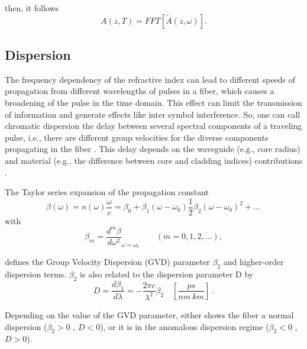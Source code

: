         then, it follows
        \begin{equation} \label{eq_deffft}
                A(z,T) = FFT \left[ \tilde{A}(z,\omega) \right].
            \end{equation}
            
            
    \subsection{Dispersion}
        The frequency dependency of the refractive index can lead to different speeds of propagation from different wavelengths of pulses in a fiber, which causes a broadening of the pulse in the time domain. This effect can limit the transmission of information and generate effects like inter symbol interference.  So, one can call chromatic dispersion the delay between several spectral components of a traveling pulse, i.e., there are different group velocities for the diverse components propagating in the fiber  \citep{Udayakumar2013ChromaticDC}. This delay depends on the waveguide (e.g., core radius) and material (e.g., the difference between core and cladding indices) contributions \citep{dudley_taylor_2010}. 
        
        The Taylor series expansion of the propagation constant 
        \begin{equation}
             \beta(\omega) = n (\omega)\frac{\omega}{c} = \beta_0 + \beta_1(\omega-\omega_0) \frac{1}{2}\beta_2(\omega-\omega_0)^2+...\, 
             \label{eq_betas}
        \end{equation}
        with 
        \begin{equation}
            \beta_m = \frac{d^m\beta}{d\omega^2}_{\omega = \omega_0} \qquad (m = 0,1,2,...),
            \label{eq_dbeta}
        \end{equation}
        
        
        defines the Group Velocity Dispersion (GVD) parameter $\beta_2$  and higher-order dispersion terms.  $\beta_2$ is also related to the dispersion parameter D by
        \begin{equation}
            D = \frac{d\beta_1}{d\lambda} = - \frac{2\pi c}{\lambda^2}\beta_2 \quad [\frac{ps}{nm \ km}] \ .
            \label{eq_Ds}
        \end{equation}
        
        Depending on the value of the GVD parameter, either shows the fiber a normal dispersion ($\beta_2 > 0$ , $D<0$), or it is in the anomalous dispersion regime ($\beta_2 < 0$ , $D>0$).
        
